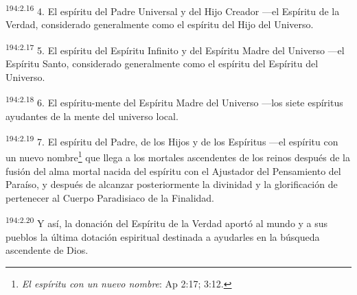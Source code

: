 \par
\textsuperscript{194:2.16} 4. El espíritu del Padre Universal y del Hijo Creador ---el Espíritu de la Verdad, considerado generalmente como el espíritu del Hijo del Universo.

\par
\textsuperscript{194:2.17} 5. El espíritu del Espíritu Infinito y del Espíritu Madre del Universo ---el Espíritu Santo, considerado generalmente como el espíritu del Espíritu del Universo.

\par
\textsuperscript{194:2.18} 6. El espíritu-mente del Espíritu Madre del Universo ---los siete espíritus ayudantes de la mente del universo local.

\par
\textsuperscript{194:2.19} 7. El espíritu del Padre, de los Hijos y de los Espíritus ---el espíritu con un nuevo nombre\footnote{\textit{El espíritu con un nuevo nombre}: Ap 2:17; 3:12.} que llega a los mortales ascendentes de los reinos después de la fusión del alma mortal nacida del espíritu con el Ajustador del Pensamiento del Paraíso, y después de alcanzar posteriormente la divinidad y la glorificación de pertenecer al Cuerpo Paradisiaco de la Finalidad.

\par
\textsuperscript{194:2.20} Y así, la donación del Espíritu de la Verdad aportó al mundo y a sus pueblos la última dotación espiritual destinada a ayudarles en la búsqueda ascendente de Dios.

